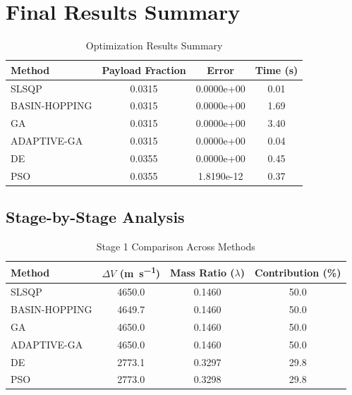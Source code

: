 \documentclass{article}
\begin{document}
\section{Final Results Summary}
\begin{table}[H]
\centering
\caption{Optimization Results Summary}
\begin{tabular}{lS[table-format=1.4]S[table-format=1.4e-1]S[table-format=1.2]}
\toprule
Method & {Payload Fraction} & {Error} & {Time (\si{\second})} \\
\midrule
SLSQP        & 0.0315 & 0.0000e+00 & 0.01 \\
BASIN-HOPPING & 0.0315 & 0.0000e+00 & 1.69 \\
GA           & 0.0315 & 0.0000e+00 & 3.40 \\
ADAPTIVE-GA  & 0.0315 & 0.0000e+00 & 0.04 \\
DE           & 0.0355 & 0.0000e+00 & 0.45 \\
PSO          & 0.0355 & 1.8190e-12 & 0.37 \\
\bottomrule
\end{tabular}
\end{table}

\subsection{Stage-by-Stage Analysis}


\begin{table}[H]
\centering
\caption{Stage 1 Comparison Across Methods}
\begin{tabular}{lS[table-format=4.1]S[table-format=1.4]S[table-format=3.1]}
\toprule
Method & {$\Delta V$ (\si{\meter\per\second})} & {Mass Ratio ($\lambda$)} & {Contribution (\%)} \\
\midrule
SLSQP        & 4650.0 & 0.1460 & 50.0 \\
BASIN-HOPPING & 4649.7 & 0.1460 & 50.0 \\
GA           & 4650.0 & 0.1460 & 50.0 \\
ADAPTIVE-GA  & 4650.0 & 0.1460 & 50.0 \\
DE           & 2773.1 & 0.3297 & 29.8 \\
PSO          & 2773.0 & 0.3298 & 29.8 \\
\bottomrule
\end{tabular}
\end{table}
\end{document}
